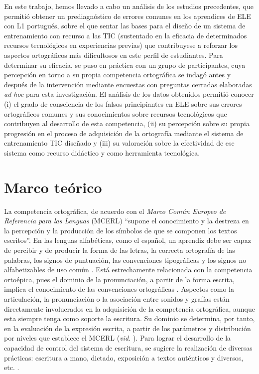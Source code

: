 \documentclass[spanish]{textolivre}
\begin{document}
En este trabajo, hemos llevado a cabo un análisis de los estudios precedentes, que permitió obtener un prediagnóstico de errores comunes en los aprendices de ELE con L1 portugués, sobre el que sentar las bases para el diseño de un sistema de entrenamiento con recurso a las TIC (sustentado en la eficacia de determinados recursos tecnológicos en experiencias previas) que contribuyese a reforzar los aspectos ortográficos más dificultosos en este perfil de estudiantes. Para determinar su eficacia, se puso en práctica con un grupo de participantes, cuya percepción en torno a su propia competencia ortográfica se indagó antes y después de la intervención mediante encuestas con preguntas cerradas elaboradas \textit{ad hoc} para esta investigación. El análisis de los datos obtenidos permitió conocer (i) el grado de consciencia de los falsos principiantes en ELE sobre sus errores ortográficos comunes y sus conocimientos sobre recursos tecnológicos que contribuyen al desarrollo de esta competencia, (ii) su percepción sobre su propia progresión en el proceso de adquisición de la ortografía mediante el sistema de entrenamiento TIC diseñado y (iii) su valoración sobre la efectividad de ese sistema como recurso didáctico y como herramienta tecnológica.   

\section{Marco teórico}\label{sec-normas}
La competencia ortográfica, de acuerdo con el \textit{Marco Común Europeo de Referencia para las Lenguas} (MCERL) \cite[p. 114]{consejo_de_europa_marco_2001} “supone el conocimiento y la destreza en la percepción y la producción de los símbolos de que se componen los textos escritos”. En las lenguas alfabéticas, como el español, un aprendiz debe ser capaz de percibir y de producir la forma de las letras, la correcta ortografía de las palabras, los signos de puntuación, las convenciones tipográficas y los signos no alfabetizables de uso común \cite{consejo_de_europa_marco_2001}. Está estrechamente relacionada con la competencia ortoépica, pues el dominio de la pronunciación, a partir de la forma escrita, implica el conocimiento de las convenciones ortográficas \cite{consejo_de_europa_marco_2001}. Aspectos como la articulación, la pronunciación o la asociación entre sonidos y grafías están directamente involucrados en la adquisición de la competencia ortográfica, aunque esta siempre tenga como soporte la escritura. Su dominio se determina, por tanto, en la evaluación de la expresión escrita, a partir de los parámetros y distribución por niveles que establece el MCERL (\textit{vid.} \textcite{consejo_de_europa_marco_2001}). Para lograr el desarrollo de la capacidad de control del sistema de escritura, se sugiere la realización de diversas prácticas: escritura a mano, dictado, exposición a textos auténticos y diversos, etc. \cite{consejo_de_europa_marco_2001}.
\end{document}
